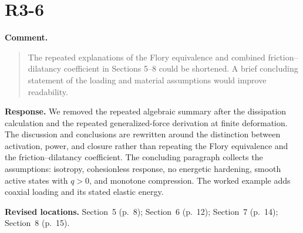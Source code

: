 \documentclass[11pt]{article}
\begin{document}
\section{R3-6}
\textbf{Comment.}\begin{quote}\small
The repeated explanations of the Flory equivalence and combined friction–dilatancy coefficient in Sections 5–8 could be shortened. A brief concluding statement of the loading and material assumptions would improve readability.
\end{quote}
\textbf{Response.} We removed the repeated algebraic summary after the
dissipation calculation and the repeated generalized-force derivation at finite
deformation. The discussion and conclusions are rewritten around the
distinction between activation, power, and closure rather than repeating the
Flory equivalence and the friction--dilatancy coefficient. The concluding
paragraph collects the assumptions: isotropy, cohesionless response, no
energetic hardening, smooth active states with \(q>0\), and monotone
compression. The worked example adds coaxial loading and its stated elastic
energy.

\textbf{Revised locations.} Section~5 (p.~8); Section~6 (p.~12); Section~7 (p.~14); Section~8 (p.~15).
\end{document}

